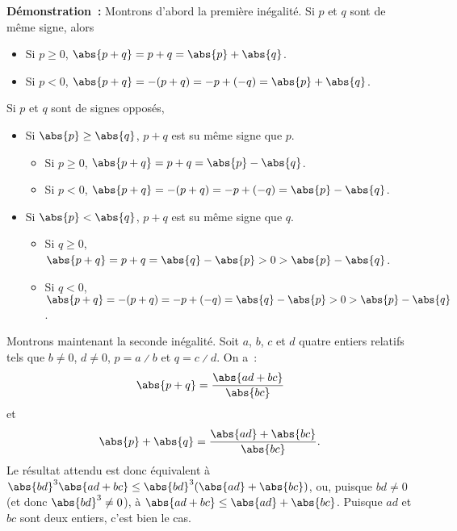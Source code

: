 \noindent\textbf{Démonstration :}
    Montrons d'abord la première inégalité. 
    Si $p$ et $q$ sont de même signe, alors 
    \begin{itemize}[nosep]
        \item Si $p \geq 0$, $\abs{p + q} = p + q = \abs{p} + \abs{q}$.
        \item Si $p < 0$, $\abs{p + q} = -(p + q) = - p + (- q) = \abs{p} + \abs{q}$.
    \end{itemize}
    Si $p$ et $q$ sont de signes opposés, 
    \begin{itemize}[nosep]
        \item Si $\abs{p} \geq \abs{q}$, $p + q$ est su même signe que $p$.
        \begin{itemize}[nosep]
            \item Si $p \geq 0$, $\abs{p + q} = p + q = \abs{p} - \abs{q}$.
            \item Si $p < 0$, $\abs{p + q} = -(p + q) = -p + (-q) = \abs{p} - \abs{q}$.
        \end{itemize}
        \item Si $\abs{p} < \abs{q}$, $p + q$ est su même signe que $q$.
        \begin{itemize}[nosep]
            \item Si $q \geq 0$, $\abs{p + q} = p + q = \abs{q} - \abs{p} > 0 > \abs{p} - \abs{q}$.
            \item Si $q < 0$, $\abs{p + q} = -(p + q) = -p + (-q) = \abs{q} - \abs{p} > 0 > \abs{p} - \abs{q}$.
        \end{itemize}
    \end{itemize}

    Montrons maintenant la seconde inégalité. 
    Soit $a$, $b$, $c$ et $d$ quatre entiers relatifs tels que $b \neq 0$, $d \neq 0$, $p = a \divslash b$ et $q = c \divslash d$.
    On a : 
    \begin{equation*}
        \abs{p + q} = \frac{\abs{a d + b c}}{\abs{b c}}
    \end{equation*}
    et 
    \begin{equation*}
        \abs{p} + \abs{q} = \frac{\abs{a d} + \abs{b c}}{\abs{b c}} .
    \end{equation*}
    Le résultat attendu est donc équivalent à $\abs{b d}^3 \abs{a d + b c} \leq \abs{b d}^3 (\abs{a d} + \abs{b c})$, ou, puisque $b d \neq 0$ (et donc $\abs{b d}^3 \neq 0$), à $ \abs{a d + b c} \leq \abs{a d} + \abs{b c}$. 
    Puisque $a d$ et $b c$ sont deux entiers, c'est bien le cas.

